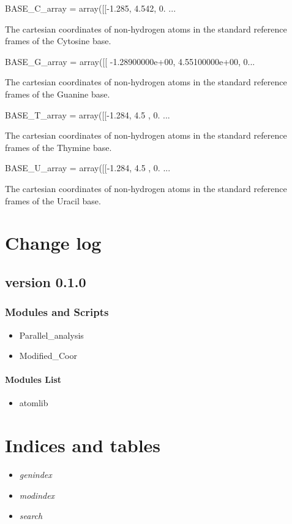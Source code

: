 \documentclass[letterpaper,10pt,english]{sphinxmanual}
\begin{document}
BASE\_C\_array = array({[}{[}-1.285, 4.542, 0. ...

The cartesian coordinates of non-hydrogen atoms in the standard reference frames of the Cytosine base.

BASE\_G\_array = array({[}{[} -1.28900000e+00, 4.55100000e+00, 0...

The cartesian coordinates of non-hydrogen atoms in the standard reference frames of the Guanine base.

BASE\_T\_array = array({[}{[}-1.284, 4.5 , 0. ...

The cartesian coordinates of non-hydrogen atoms in the standard reference frames of the Thymine base.

BASE\_U\_array = array({[}{[}-1.284, 4.5 , 0. ...

The cartesian coordinates of non-hydrogen atoms in the standard reference frames of the Uracil base.


\chapter{Change log}
\label{documentation_pages/change::doc}\label{documentation_pages/change:change-log}

\section{version 0.1.0}
\label{documentation_pages/change:version-0-1-0}

\subsection{Modules and Scripts}
\label{documentation_pages/change:modules-and-scripts}\begin{itemize}
\item {} 
Parallel\_analysis

\item {} 
Modified\_Coor

\end{itemize}


\subsubsection{Modules List}
\label{documentation_pages/change:modules-list}\begin{itemize}
\item {} 
atomlib

\end{itemize}


\chapter{Indices and tables}
\label{index:indices-and-tables}\begin{itemize}
\item {} 
\emph{genindex}

\item {} 
\emph{modindex}

\item {} 
\emph{search}

\end{itemize}



\renewcommand{\indexname}{Index}
\printindex
\end{document}
